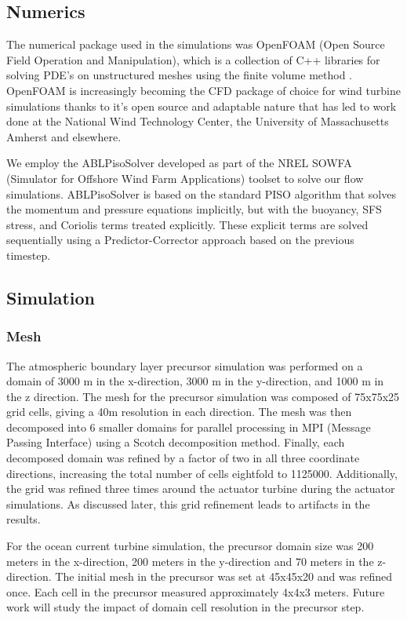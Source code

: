 \subsection{Numerics}


The numerical package used in the simulations was OpenFOAM (Open Source Field Operation and Manipulation), which is a collection of C++ libraries for solving PDE's on unstructured meshes using the finite volume method \cite{OpenFOAM}. OpenFOAM is increasingly becoming the CFD package of choice for wind turbine simulations thanks to it's open source and adaptable nature that has led to work done at the National Wind Technology Center, the University of Massachusetts Amherst and elsewhere.

We employ the ABLPisoSolver developed as part of the NREL SOWFA (Simulator for Offshore Wind Farm Applications) toolset \cite{SOWFA} to solve our flow simulations.  ABLPisoSolver is based on the standard PISO algorithm that solves the momentum and pressure equations implicitly, but with the buoyancy, SFS stress, and Coriolis terms treated explicitly.  These explicit terms are solved sequentially using a Predictor-Corrector approach based on the previous timestep.  

\subsection{Simulation}


\subsubsection{Mesh}

The atmospheric boundary layer precursor simulation was performed on a domain of 3000 m in the x-direction, 3000 m in the y-direction, and 1000 m in the z direction.  The mesh for the precursor simulation was composed of 75x75x25 grid cells, giving a 40m resolution in each direction.  The mesh was then decomposed into 6 smaller domains for parallel processing in MPI (Message Passing Interface) using a Scotch decomposition method.  Finally, each decomposed domain was refined by a factor of two in all three coordinate directions, increasing the total number of cells eightfold to 1125000.  Additionally, the grid was refined three times around the actuator turbine during the actuator simulations.  As discussed later, this grid refinement leads to artifacts in the results.

For the ocean current turbine simulation, the precursor domain size was 200 meters in the x-direction, 200 meters in the y-direction and 70 meters in the z-direction. The initial mesh in the precursor was set at 45x45x20 and was refined once. Each cell in the precursor measured approximately 4x4x3 meters. Future work will study the impact of domain cell resolution in the precursor step.

